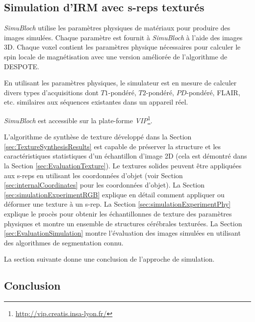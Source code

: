 \subsection{Simulation d'IRM avec s-reps texturés}

\textit{SimuBloch} utilise les paramètres physiques de matériaux pour produire des images simulées.
Chaque paramètre est fournit à \textit{SimuBloch} à l'aide des images 3D.
Chaque voxel contient les paramètres physique nécessaires pour calculer le 
spin locale de magnétisation avec une version améliorée de l'algorithme de DESPOTE.

En utilisant les paramètres physiques, le simulateur est en mesure de calculer
divers types d'acquisitions dont
$T1$-pondéré, $T2$-pondéré, $PD$-pondéré, FLAIR, etc.
similaires aux séquences existantes dans un appareil réel.

\textit{SimuBloch} est accessible sur la plate-forme \textit{VIP}\footnote {\url {http://vip.creatis.insa-lyon.fr/}}.

L'algorithme de synthèse de texture développé dans la Section \ref{sec:TextureSynthesisResults} est capable de
préserver la structure et les caractéristiques statistiques d'un échantillon d'image 2D (cela est démontré dans la Section \ref{sec:EvaluationTexture}).
Le textures solides peuvent être appliquées aux s-reps en utilisant les coordonnées d'objet (voir Section \ref{sec:internalCoordinates} pour les coordonnées d'objet).
La Section \ref{sec:simulationExperimentRGB} explique en détail comment appliquer ou déformer une texture à un s-rep.
La Section \ref{sec:simulationExperimentPhy} explique le procès pour obtenir les échantillonnes de texture des paramètres physiques 
et montre un ensemble de structures cérébrales texturées. 
La Section \ref{sec:EvaluationSimulation} montre l'évaluation des images simulées en utilisant des algorithmes de segmentation connu.

La section suivante donne une conclusion de l'approche de simulation.

\subsection{Conclusion}

